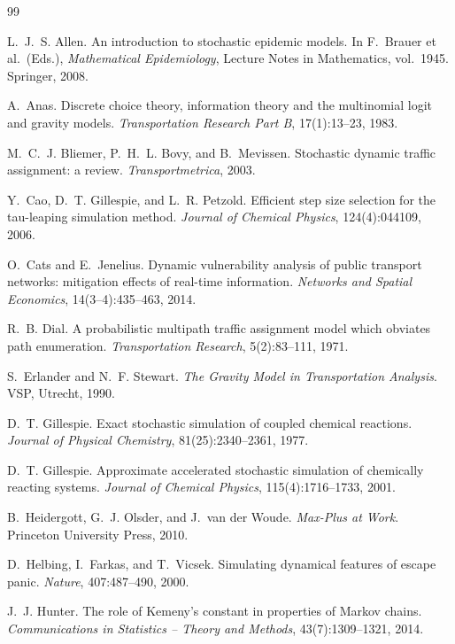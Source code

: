 \documentclass[11pt,a4paper]{article}
\theoremstyle{plain}
\theoremstyle{definition}
\theoremstyle{remark}
\begin{document}

\begin{thebibliography}{99}

L.~J.~S. Allen.
An introduction to stochastic epidemic models.
In F.~Brauer et al.\ (Eds.), \emph{Mathematical Epidemiology},
Lecture Notes in Mathematics, vol.~1945. Springer, 2008.

A.~Anas.
Discrete choice theory, information theory and the multinomial logit and gravity
models.
\emph{Transportation Research Part B}, 17(1):13--23, 1983.

M.~C.~J. Bliemer, P.~H.~L. Bovy, and B.~Mevissen.
Stochastic dynamic traffic assignment: a review.
\emph{Transportmetrica}, 2003.

Y.~Cao, D.~T. Gillespie, and L.~R. Petzold.
Efficient step size selection for the tau-leaping simulation method.
\emph{Journal of Chemical Physics}, 124(4):044109, 2006.

O.~Cats and E.~Jenelius.
Dynamic vulnerability analysis of public transport networks: mitigation effects
of real-time information.
\emph{Networks and Spatial Economics}, 14(3--4):435--463, 2014.

R.~B. Dial.
A probabilistic multipath traffic assignment model which obviates path
enumeration.
\emph{Transportation Research}, 5(2):83--111, 1971.

S.~Erlander and N.~F. Stewart.
\emph{The Gravity Model in Transportation Analysis}.
VSP, Utrecht, 1990.

D.~T. Gillespie.
Exact stochastic simulation of coupled chemical reactions.
\emph{Journal of Physical Chemistry}, 81(25):2340--2361, 1977.

D.~T. Gillespie.
Approximate accelerated stochastic simulation of chemically reacting systems.
\emph{Journal of Chemical Physics}, 115(4):1716--1733, 2001.

B.~Heidergott, G.~J. Olsder, and J.~van der Woude.
\emph{Max-Plus at Work}.
Princeton University Press, 2010.

D.~Helbing, I.~Farkas, and T.~Vicsek.
Simulating dynamical features of escape panic.
\emph{Nature}, 407:487--490, 2000.

J.~J. Hunter.
The role of Kemeny's constant in properties of Markov chains.
\emph{Communications in Statistics -- Theory and Methods}, 43(7):1309--1321,
2014.


\end{thebibliography}
\end{document}
